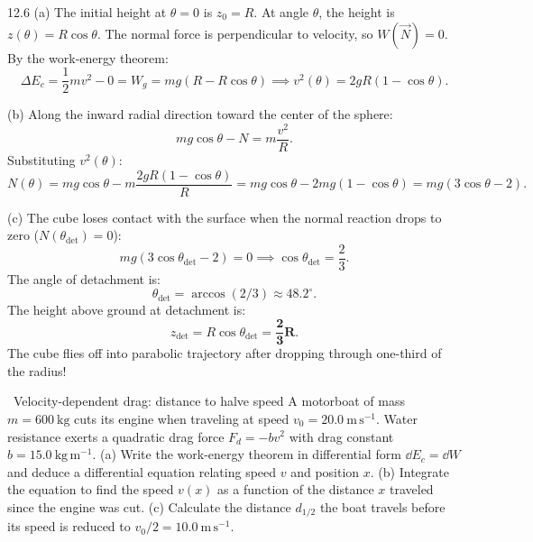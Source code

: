 \begin{tabletworkspace}[6.0cm]
\end{tabletworkspace}

\begin{solution}{12.6}
(a) The initial height at $\theta = 0$ is $z_0 = R$. At angle $\theta$, the height is $z(\theta) = R\cos\theta$.
The normal force is perpendicular to velocity, so $W(\vec{N}) = 0$.
By the work-energy theorem:
\[
\Delta E_c = \frac{1}{2}m v^2 - 0 = W_g = mg(R - R\cos\theta) \implies \boxed{v^2(\theta) = 2gR(1 - \cos\theta).}
\]

(b) Along the inward radial direction toward the center of the sphere:
\[
mg\cos\theta - N = m\frac{v^2}{R}.
\]
Substituting $v^2(\theta)$:
\[
N(\theta) = mg\cos\theta - m\frac{2gR(1 - \cos\theta)}{R} = mg\cos\theta - 2mg(1 - \cos\theta) = \boxed{mg(3\cos\theta - 2).}
\]

(c) The cube loses contact with the surface when the normal reaction drops to zero ($N(\theta_{\text{det}}) = 0$):
\[
mg(3\cos\theta_{\text{det}} - 2) = 0 \implies \boxed{\cos\theta_{\text{det}} = \frac{2}{3}.}
\]
The angle of detachment is:
\[
\theta_{\text{det}} = \arccos(2/3) \approx \mathbf{48.2^\circ.}
\]
The height above ground at detachment is:
\[
z_{\text{det}} = R\cos\theta_{\text{det}} = \mathbf{\frac{2}{3}R.}
\]
The cube flies off into parabolic trajectory after dropping through one-third of the radius!
\end{solution}

\begin{exercise}{\mastery\ Velocity-dependent drag: distance to halve speed}
A motorboat of mass $m=600\ \mathrm{kg}$ cuts its engine when traveling at speed $v_0=20.0\ \mathrm{m\,s^{-1}}$. Water resistance exerts a quadratic drag force $F_d = -b v^2$ with drag constant $b = 15.0\ \mathrm{kg\,m^{-1}}$.
(a) Write the work-energy theorem in differential form $\dd E_c = \dd W$ and deduce a differential equation relating speed $v$ and position $x$.
(b) Integrate the equation to find the speed $v(x)$ as a function of the distance $x$ traveled since the engine was cut.
(c) Calculate the distance $d_{1/2}$ the boat travels before its speed is reduced to $v_0/2 = 10.0\ \mathrm{m\,s^{-1}}$.
\end{exercise}

\begin{tabletworkspace}[5.5cm]
\end{tabletworkspace}

